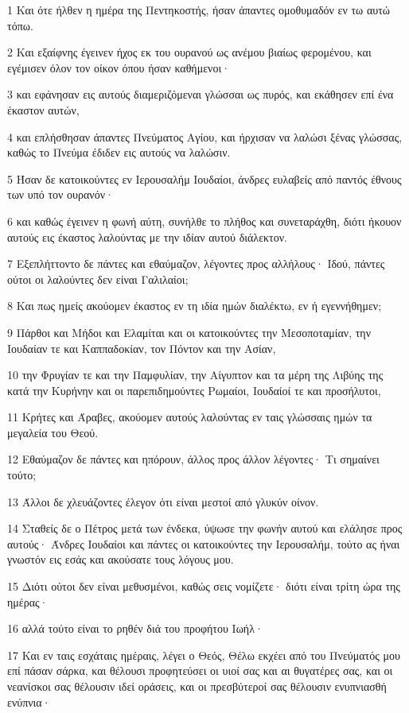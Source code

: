 \par 1 Και ότε ήλθεν η ημέρα της Πεντηκοστής, ήσαν άπαντες ομοθυμαδόν εν τω αυτώ τόπω.
\par 2 Και εξαίφνης έγεινεν ήχος εκ του ουρανού ως ανέμου βιαίως φερομένου, και εγέμισεν όλον τον οίκον όπου ήσαν καθήμενοι·
\par 3 και εφάνησαν εις αυτούς διαμεριζόμεναι γλώσσαι ως πυρός, και εκάθησεν επί ένα έκαστον αυτών,
\par 4 και επλήσθησαν άπαντες Πνεύματος Αγίου, και ήρχισαν να λαλώσι ξένας γλώσσας, καθώς το Πνεύμα έδιδεν εις αυτούς να λαλώσιν.
\par 5 Ήσαν δε κατοικούντες εν Ιερουσαλήμ Ιουδαίοι, άνδρες ευλαβείς από παντός έθνους των υπό τον ουρανόν·
\par 6 και καθώς έγεινεν η φωνή αύτη, συνήλθε το πλήθος και συνεταράχθη, διότι ήκουον αυτούς εις έκαστος λαλούντας με την ιδίαν αυτού διάλεκτον.
\par 7 Εξεπλήττοντο δε πάντες και εθαύμαζον, λέγοντες προς αλλήλους· Ιδού, πάντες ούτοι οι λαλούντες δεν είναι Γαλιλαίοι;
\par 8 Και πως ημείς ακούομεν έκαστος εν τη ιδία ημών διαλέκτω, εν ή εγεννήθημεν;
\par 9 Πάρθοι και Μήδοι και Ελαμίται και οι κατοικούντες την Μεσοποταμίαν, την Ιουδαίαν τε και Καππαδοκίαν, τον Πόντον και την Ασίαν,
\par 10 την Φρυγίαν τε και την Παμφυλίαν, την Αίγυπτον και τα μέρη της Λιβύης της κατά την Κυρήνην και οι παρεπιδημούντες Ρωμαίοι, Ιουδαίοί τε και προσήλυτοι,
\par 11 Κρήτες και Άραβες, ακούομεν αυτούς λαλούντας εν ταις γλώσσαις ημών τα μεγαλεία του Θεού.
\par 12 Εθαύμαζον δε πάντες και ηπόρουν, άλλος προς άλλον λέγοντες· Τι σημαίνει τούτο;
\par 13 Άλλοι δε χλευάζοντες έλεγον ότι είναι μεστοί από γλυκύν οίνον.
\par 14 Σταθείς δε ο Πέτρος μετά των ένδεκα, ύψωσε την φωνήν αυτού και ελάλησε προς αυτούς· Άνδρες Ιουδαίοι και πάντες οι κατοικούντες την Ιερουσαλήμ, τούτο ας ήναι γνωστόν εις εσάς και ακούσατε τους λόγους μου.
\par 15 Διότι ούτοι δεν είναι μεθυσμένοι, καθώς σεις νομίζετε· διότι είναι τρίτη ώρα της ημέρας·
\par 16 αλλά τούτο είναι το ρηθέν διά του προφήτου Ιωήλ·
\par 17 Και εν ταις εσχάταις ημέραις, λέγει ο Θεός, Θέλω εκχέει από του Πνεύματός μου επί πάσαν σάρκα, και θέλουσι προφητεύσει οι υιοί σας και αι θυγατέρες σας, και οι νεανίσκοι σας θέλουσιν ιδεί οράσεις, και οι πρεσβύτεροί σας θέλουσιν ενυπνιασθή ενύπνια·

